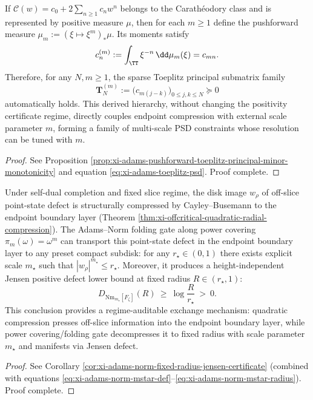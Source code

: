 \begin{conclusion}\label{con:xi-terminal-adams-toeplitz-psd-hierarchy}
If \(\mathscr{C}(w)=c_0+2\sum_{n\ge 1}c_n w^n\) belongs to the Carathéodory class and is represented by positive measure \(\mu\), then for each \(m\ge 1\) define the pushforward measure \(\mu_m:=(\xi\mapsto\xi^m)_\ast\mu\). Its moments satisfy
\[
c^{(m)}_n:=\int_{\TT}\xi^{-n}\,\dd\mu_m(\xi)=c_{mn}.
\]
Therefore, for any \(N,m\ge 1\), the sparse Toeplitz principal submatrix family
\[
\mathbf{T}^{(m)}_N:=\bigl(c_{m(j-k)}\bigr)_{0\le j,k\le N}\succeq 0
\]
automatically holds. This derived hierarchy, without changing the positivity certificate regime, directly couples endpoint compression with external scale parameter \(m\), forming a family of multi-scale PSD constraints whose resolution can be tuned with \(m\).
\end{conclusion}
\begin{proof}[Proof]
See Proposition \ref{prop:xi-adams-pushforward-toeplitz-principal-minor-monotonicity} and equation \eqref{eq:xi-adams-toeplitz-psd}. Proof complete.
\end{proof}

\begin{conclusion}\label{con:xi-terminal-scale-exchange-power-covering-jensen}
Under self-dual completion and fixed slice regime, the disk image \(w_\rho\) of off-slice point-state defect is structurally compressed by Cayley--Busemann to the endpoint boundary layer (Theorem \ref{thm:xi-offcritical-quadratic-radial-compression}).
The Adams--Norm folding gate along power covering \(\pi_m(\omega)=\omega^m\) can transport this point-state defect in the endpoint boundary layer to any preset compact subdisk: for any \(r_\star\in(0,1)\) there exists explicit scale \(m_\star\) such that \(|w_\rho|^{m_\star}\le r_\star\).
Moreover, it produces a height-independent Jensen positive defect lower bound at fixed radius \(R\in(r_\star,1)\):
\[
D_{\mathrm{Nm}_{m_\star}[F_\zeta]}(R)\ \ge\ \log\!\frac{R}{r_\star}\ >\ 0.
\]
This conclusion provides a regime-auditable exchange mechanism: quadratic compression presses off-slice information into the endpoint boundary layer, while power covering/folding gate decompresses it to fixed radius with scale parameter \(m_\star\) and manifests via Jensen defect.
\end{conclusion}
\begin{proof}[Proof]
See Corollary \ref{cor:xi-adams-norm-fixed-radius-jensen-certificate} (combined with equations \eqref{eq:xi-adams-norm-mstar-def}--\eqref{eq:xi-adams-norm-mstar-radius}). Proof complete.
\end{proof}

